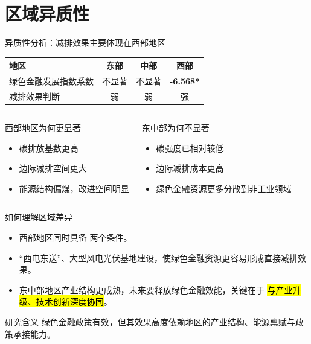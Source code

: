 \section{区域异质性}

\begin{frame}{异质性分析：减排效果主要体现在西部地区}
  \begin{table}
    \centering
    \small
    \begin{tabular}{@{}lccc@{}}
      \toprule
      地区 & 东部 & 中部 & 西部 \\
      \midrule
      绿色金融发展指数系数 & 不显著 & 不显著 & \textbf{-6.568*} \\
      减排效果判断 & 弱 & 弱 & 强 \\
      \bottomrule
    \end{tabular}
  \end{table}

  \begin{columns}[T,onlytextwidth]
    \begin{block}{西部地区为何更显著}
      \begin{itemize}
        \item 碳排放基数更高
        \item 边际减排空间更大
        \item 能源结构偏煤，改进空间明显
      \end{itemize}
    \end{block}

    \begin{exampleblock}{东中部为何不显著}
      \begin{itemize}
        \item 碳强度已相对较低
        \item 边际减排成本更高
        \item 绿色金融资源更多分散到非工业领域
      \end{itemize}
    \end{exampleblock}
  \end{columns}
\end{frame}

\begin{frame}{如何理解区域差异}
  \begin{itemize}
    \item 西部地区同时具备  两个条件。
    \item “西电东送”、大型风电光伏基地建设，使绿色金融资源更容易形成直接减排效果。
    \item 东中部地区产业结构更成熟，未来要释放绿色金融效能，关键在于 \hl{与产业升级、技术创新深度协同}。
  \end{itemize}

  \begin{alertblock}{研究含义}
    绿色金融政策有效，但其效果高度依赖地区的产业结构、能源禀赋与政策承接能力。
  \end{alertblock}
\end{frame}
